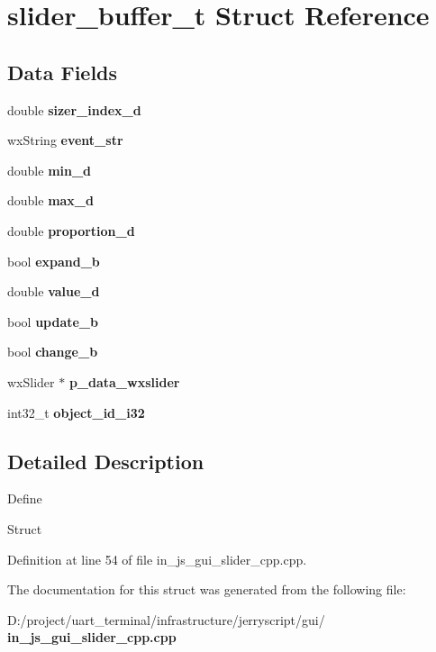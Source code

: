 \section{slider\+\_\+buffer\+\_\+t Struct Reference}
\label{structslider__buffer__t}
\subsection*{Data Fields}
\begin{DoxyCompactItemize}
\item 
\mbox{\label{structslider__buffer__t_aae99f717aadbf88f890c71a293468af8}} 
double {\bfseries sizer\+\_\+index\+\_\+d}
\item 
\mbox{\label{structslider__buffer__t_a43aba9d4f0f518678c2dd03b5bfd9e7e}} 
wx\+String {\bfseries event\+\_\+str}
\item 
\mbox{\label{structslider__buffer__t_aa227f41b50c9f8c62a10df5d4e66fe6b}} 
double {\bfseries min\+\_\+d}
\item 
\mbox{\label{structslider__buffer__t_ab0bacd01a71d4a464694866fb1502a4b}} 
double {\bfseries max\+\_\+d}
\item 
\mbox{\label{structslider__buffer__t_a93e3ac3895fbb25863fb66af78e0ed39}} 
double {\bfseries proportion\+\_\+d}
\item 
\mbox{\label{structslider__buffer__t_a53aa234b863a2576e80b08f9dab88ca3}} 
bool {\bfseries expand\+\_\+b}
\item 
\mbox{\label{structslider__buffer__t_a5a05b112887b06e0421e4950b7e0e2fe}} 
double {\bfseries value\+\_\+d}
\item 
\mbox{\label{structslider__buffer__t_a4aed9ad79f44786d35de6f7804904494}} 
bool {\bfseries update\+\_\+b}
\item 
\mbox{\label{structslider__buffer__t_a70eabe6f222b798dfe3e510777055022}} 
bool {\bfseries change\+\_\+b}
\item 
\mbox{\label{structslider__buffer__t_ac57eb2e9448ce18e28297277ce42624c}} 
wx\+Slider $\ast$ {\bfseries p\+\_\+data\+\_\+wxslider}
\item 
\mbox{\label{structslider__buffer__t_aa7683407966206b7eb17d410ee75d880}} 
int32\+\_\+t {\bfseries object\+\_\+id\+\_\+i32}
\end{DoxyCompactItemize}


\subsection{Detailed Description}
Define

Struct 

Definition at line 54 of file in\+\_\+js\+\_\+gui\+\_\+slider\+\_\+cpp.\+cpp.



The documentation for this struct was generated from the following file\+:\begin{DoxyCompactItemize}
\item 
D\+:/project/uart\+\_\+terminal/infrastructure/jerryscript/gui/\textbf{ in\+\_\+js\+\_\+gui\+\_\+slider\+\_\+cpp.\+cpp}\end{DoxyCompactItemize}
